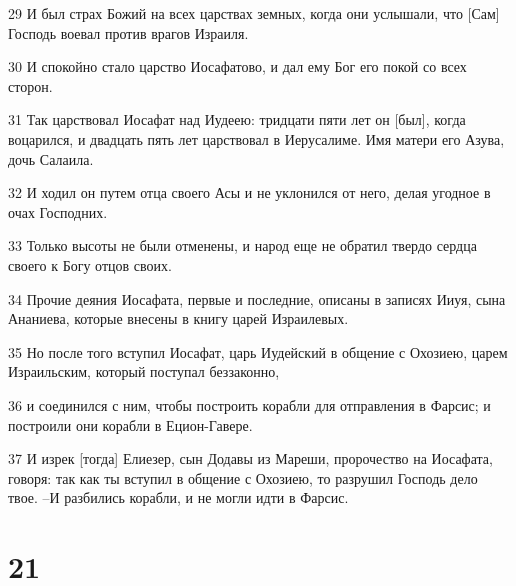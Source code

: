 \par 29 И был страх Божий на всех царствах земных, когда они услышали, что [Сам] Господь воевал против врагов Израиля.
\par 30 И спокойно стало царство Иосафатово, и дал ему Бог его покой со всех сторон.
\par 31 Так царствовал Иосафат над Иудеею: тридцати пяти лет он [был], когда воцарился, и двадцать пять лет царствовал в Иерусалиме. Имя матери его Азува, дочь Салаила.
\par 32 И ходил он путем отца своего Асы и не уклонился от него, делая угодное в очах Господних.
\par 33 Только высоты не были отменены, и народ еще не обратил твердо сердца своего к Богу отцов своих.
\par 34 Прочие деяния Иосафата, первые и последние, описаны в записях Ииуя, сына Ананиева, которые внесены в книгу царей Израилевых.
\par 35 Но после того вступил Иосафат, царь Иудейский в общение с Охозиею, царем Израильским, который поступал беззаконно,
\par 36 и соединился с ним, чтобы построить корабли для отправления в Фарсис; и построили они корабли в Ецион-Гавере.
\par 37 И изрек [тогда] Елиезер, сын Додавы из Мареши, пророчество на Иосафата, говоря: так как ты вступил в общение с Охозиею, то разрушил Господь дело твое. --И разбились корабли, и не могли идти в Фарсис.

\chapter{21}

